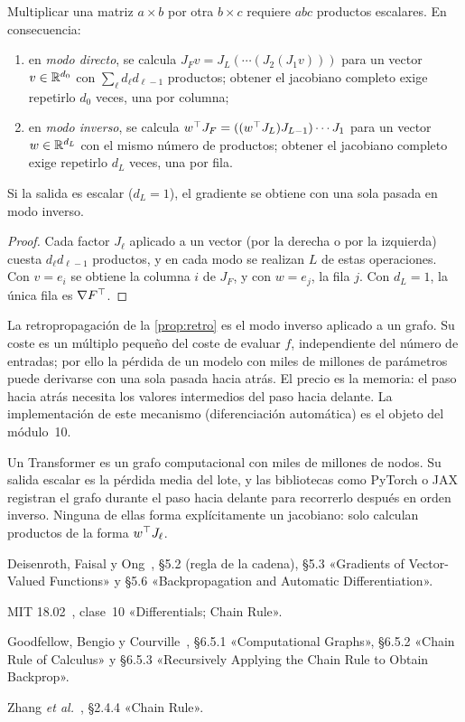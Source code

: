 \begin{proposicion}\label{prop:modos}
Multiplicar una matriz $a\times b$ por otra $b\times c$ requiere $abc$ productos escalares. En consecuencia:
\begin{enumerate}
  \item en \emph{modo directo}, se calcula $J_F v=J_L(\cdots(J_2(J_1 v)))$ para un vector $v\in\mathbb{R}^{d_0}$ con $\sum_\ell d_\ell d_{\ell-1}$ productos; obtener el jacobiano completo exige repetirlo $d_0$ veces, una por columna;
  \item en \emph{modo inverso}, se calcula $w^{\top} J_F=((w^{\top} J_L)J_{L-1})\cdots J_1$ para un vector $w\in\mathbb{R}^{d_L}$ con el mismo número de productos; obtener el jacobiano completo exige repetirlo $d_L$ veces, una por fila.
\end{enumerate}
Si la salida es escalar ($d_L=1$), el gradiente se obtiene con una sola pasada en modo inverso.
\end{proposicion}

\begin{proof}
Cada factor $J_\ell$ aplicado a un vector (por la derecha o por la izquierda) cuesta $d_\ell d_{\ell-1}$ productos, y en cada modo se realizan $L$ de estas operaciones. Con $v=e_i$ se obtiene la columna $i$ de $J_F$, y con $w=e_j$, la fila $j$. Con $d_L=1$, la única fila es $\nabla F^{\top}$.
\end{proof}

La retropropagación de la \cref{prop:retro} es el modo inverso aplicado a un grafo. Su coste es un múltiplo pequeño del coste de evaluar $f$, independiente del número de entradas; por ello la pérdida de un modelo con miles de millones de parámetros puede derivarse con una sola pasada hacia atrás. El precio es la memoria: el paso hacia atrás necesita los valores intermedios del paso hacia delante. La implementación de este mecanismo (diferenciación automática) es el objeto del módulo~10.

\begin{observacion}
Un Transformer es un grafo computacional con miles de millones de nodos. Su salida escalar es la pérdida media del lote, y las bibliotecas como PyTorch o JAX registran el grafo durante el paso hacia delante para recorrerlo después en orden inverso. Ninguna de ellas forma explícitamente un jacobiano: solo calculan productos de la forma $w^{\top} J_\ell$.
\end{observacion}

\begin{lecturas}
\item Deisenroth, Faisal y Ong~\cite{mml}, §5.2 (regla de la cadena), §5.3 «Gradients of Vector-Valued Functions» y §5.6 «Backpropagation and Automatic Differentiation».
\item MIT 18.02~\cite{mit1802}, clase~10 «Differentials; Chain Rule».
\item Goodfellow, Bengio y Courville~\cite{gbc}, §6.5.1 «Computational Graphs», §6.5.2 «Chain Rule of Calculus» y §6.5.3 «Recursively Applying the Chain Rule to Obtain Backprop».
\item Zhang \emph{et al.}~\cite{d2l}, §2.4.4 «Chain Rule».
\end{lecturas}


